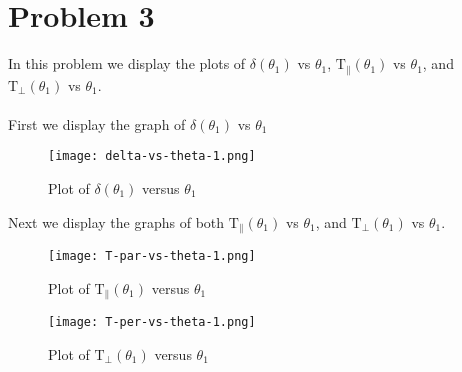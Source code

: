 \section*{Problem 3}

In this problem we display the plots of $\delta(\theta_1)$ vs $\theta_1$, $\mathrm{T}_\parallel(\theta_1)$ vs $\theta_1$, and 
$\mathrm{T}_\bot(\theta_1)$ vs $\theta_1$.
\\
\\
First we display the graph of $\delta(\theta_1)$ vs $\theta_1$

\begin{figure}[ht]
	\centering
		\texttt{[image: delta-vs-theta-1.png]}
		\caption{Plot of $\delta(\theta_1)$ versus $\theta_1$}
\end{figure}

Next we display the graphs of both $\mathrm{T}_\parallel(\theta_1)$ vs $\theta_1$, and $\mathrm{T}_\bot(\theta_1)$ vs $\theta_1$.

\begin{figure}[!b]
	\begin{minipage}{0.5\textwidth}
		\centering
			\texttt{[image: T-par-vs-theta-1.png]}
			\caption{Plot of $\mathrm{T}_\parallel(\theta_1)$ versus $\theta_1$}
	\end{minipage}
	\begin{minipage}{0.5\textwidth}	
		\centering
			\texttt{[image: T-per-vs-theta-1.png]}
			\caption{Plot of $\mathrm{T}_\bot(\theta_1)$ versus $\theta_1$}
	\end{minipage}
\end{figure}